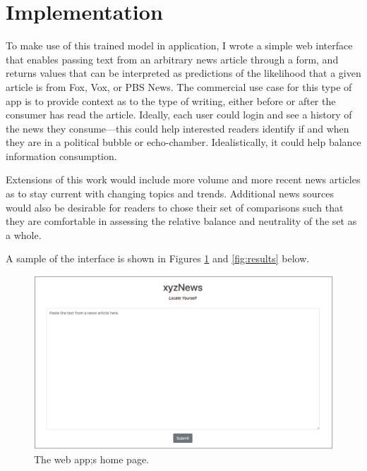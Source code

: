 \documentclass{article}
\begin{document}
	
	\section{Implementation}
	
	To make use of this trained model in application, I wrote a simple web interface that enables passing text from an arbitrary news article through a form, and returns values that can be interpreted as predictions of the likelihood that a given article is from Fox, Vox, or PBS News. The commercial use case for this type of app is to provide context as to the type of writing, either before or after the consumer has read the article. Ideally, each user could login and see a history of the news they consume---this could help interested readers identify if and when they are in a political bubble or echo-chamber. Idealistically, it could help balance information consumption. 
	
	Extensions of this work would include more volume and more recent news articles as to stay current with changing topics and trends. Additional news sources would also be desirable for readers to chose their set of comparisons such that they are comfortable in assessing the relative balance and neutrality of the set as a whole. 
	
	A sample of the interface is shown in Figures \ref{fig:form} and \ref{fig:results} below. 	
	
	\begin{figure}[H]
		\includegraphics[width=\textwidth]{figures/images/web-form.png}
		\caption{The web app;s home page.}
		\label{fig:form}
	\end{figure}
\end{document}
